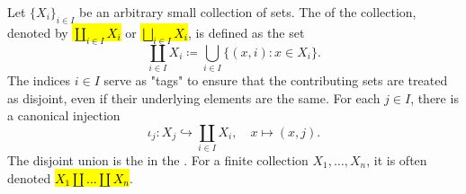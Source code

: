 \begin{definition} \label{definition:disjoint_union_of_sets}
    Let $\{X_i\}_{i \in I}$ be an arbitrary small collection of sets. The  of the collection, denoted by \hl{$\coprod_{i \in I} X_i$} or \hl{$\bigsqcup_{i \in I} X_i$}, is defined as the set
    $$    \coprod_{i \in I} X_i \coloneqq \bigcup_{i \in I} \{ (x, i) : x \in X_i \}. $$
    The indices $i \in I$ serve as "tags" to ensure that the contributing sets are treated as disjoint, even if their underlying elements are the same. For each $j \in I$, there is a canonical injection
    $$    \iota_j : X_j \hookrightarrow \coprod_{i \in I} X_i, \quad x \mapsto (x, j). $$
    The disjoint union is the  in the . For a finite collection $X_1, \dots, X_n$, it is often denoted \hl{$X_1 \amalg \dots \amalg X_n$}.
\end{definition}